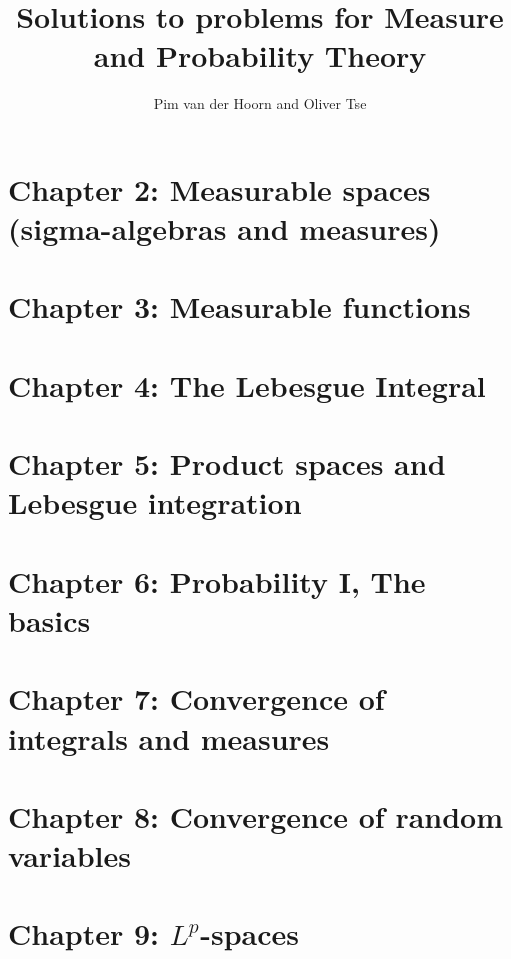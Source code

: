\documentclass{lecturenotes}
\begin{document}
\begin{titlepage}
    \title{Solutions to problems for Measure and Probability Theory}
    \author{Pim van der Hoorn and Oliver Tse}
    \maketitle
\end{titlepage}


\section*{Chapter 2: Measurable spaces (sigma-algebras and measures)}


\newpage
\section*{Chapter 3: Measurable functions}


\newpage
\section*{Chapter 4: The Lebesgue Integral}


\newpage
\section*{Chapter 5: Product spaces and Lebesgue integration}


\newpage
\section*{Chapter 6: Probability I, The basics}


\newpage
\section*{Chapter 7: Convergence of integrals and measures}


\newpage
\section*{Chapter 8: Convergence of random variables}


\newpage
\section*{Chapter 9: $L^p$-spaces}

\end{document}
